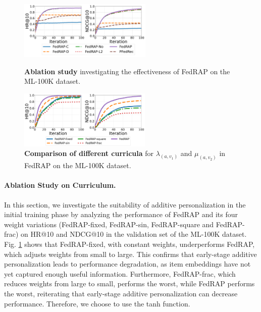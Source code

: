 \documentclass{article} %
\begin{document}
\begin{figure}[!htbp]
    \centering
  \begin{minipage}[t]{0.49\linewidth}
    \centering
    \includegraphics[height=7.5em]{ablation_effective_MovieLens-100k.pdf}
    \caption{\textbf{Ablation study} investigating the effectiveness of FedRAP on the ML-100K dataset.}
    \label{fig:ablation_effective}
  \end{minipage}
    \hfill
  \begin{minipage}[t]{0.49\linewidth}
    \centering
    \includegraphics[height=7.5em]{ablation_params.pdf}
    \caption{\textbf{Comparison of different curricula} for $\lambda_{(a,v_1)}$ and $\mu_{(a,v_2)}$ in FedRAP on the ML-100K dataset.}
    \label{fig:ablation_varying_types}
  \end{minipage}
\end{figure}

\paragraph{Ablation Study on Curriculum.}
In this section, we investigate the suitability of additive personalization in the initial training phase by analyzing the performance of FedRAP and its four weight variations (FedRAP-fixed, FedRAP-sin, FedRAP-square and FedRAP-frac) on HR@10 and NDCG@10 in the validation set of the ML-100K dataset. 
Fig. \ref{fig:ablation_varying_types} shows that FedRAP-fixed, with constant weights, underperforms FedRAP, which adjusts weights from small to large. This confirms that early-stage additive personalization leads to performance degradation, as item embeddings have not yet captured enough useful information. 
Furthermore, FedRAP-frac, which reduces weights from large to small, performs the worst, while FedRAP performs the worst, reiterating that early-stage additive personalization can decrease performance. Therefore, we choose to use the tanh function.
\end{document}

